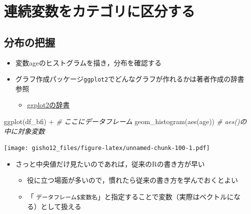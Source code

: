 \documentclass[
  xelatex,ja=standard, b5paper]{bxjsbook}
\newenvironment{Shaded}{\begin{snugshade}}{\end{snugshade}}
\newcommand{\CommentTok}[1]{\textcolor[rgb]{0.56,0.35,0.01}{\textit{#1}}}
\newcommand{\FunctionTok}[1]{\textcolor[rgb]{0.00,0.00,0.00}{#1}}
\newcommand{\NormalTok}[1]{#1}
\newcommand{\SpecialCharTok}[1]{\textcolor[rgb]{0.00,0.00,0.00}{#1}}
\providecommand{\tightlist}{%
  \setlength{\itemsep}{0pt}\setlength{\parskip}{0pt}}
\begin{document}
\hypertarget{ux9023ux7d9aux5909ux6570ux3092ux30abux30c6ux30b4ux30eaux306bux533aux5206ux3059ux308b}{%
\section{連続変数をカテゴリに区分する}\label{ux9023ux7d9aux5909ux6570ux3092ux30abux30c6ux30b4ux30eaux306bux533aux5206ux3059ux308b}}

\hypertarget{ux5206ux5e03ux306eux628aux63e1}{%
\subsection{分布の把握}\label{ux5206ux5e03ux306eux628aux63e1}}

\begin{itemize}
\tightlist
\item
  変数ageのヒストグラムを描き，分布を確認する
\item
  グラフ作成パッケージ\texttt{ggplot2}でどんなグラフが作れるかは著者作成の辞書参照

  \begin{itemize}
  \tightlist
  \item
    \href{https://izunyan.github.io/practice_ggplot2/}{ggplot2の辞書}
  \end{itemize}
\end{itemize}

\begin{Shaded}
\begin{Highlighting}[]
\FunctionTok{ggplot}\NormalTok{(df\_bfi) }\SpecialCharTok{+}           \CommentTok{\# ここにデータフレーム}
  \FunctionTok{geom\_histogram}\NormalTok{(}\FunctionTok{aes}\NormalTok{(age)) }\CommentTok{\# aes()の中に対象変数}
\end{Highlighting}
\end{Shaded}

\texttt{[image: gisho12\_files/figure-latex/unnamed-chunk-100-1.pdf]}

\begin{itemize}
\tightlist
\item
  さっと中央値だけ見たいのであれば，従来のRの書き方が早い

  \begin{itemize}
  \tightlist
  \item
    役に立つ場面が多いので，慣れたら従来の書き方を学んでおくとよい
  \item
    「 \texttt{データフレーム\$変数名}」と指定することで変数（実際はベクトルになる）として扱える
  \end{itemize}
\end{itemize}
\end{document}
